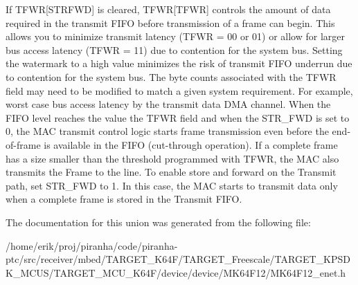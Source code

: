 If T\+F\+WR\mbox{[}S\+T\+R\+F\+WD\mbox{]} is cleared, T\+F\+WR\mbox{[}T\+F\+WR\mbox{]} controls the amount of data required in the transmit F\+I\+FO before transmission of a frame can begin. This allows you to minimize transmit latency (T\+F\+WR = 00 or 01) or allow for larger bus access latency (T\+F\+WR = 11) due to contention for the system bus. Setting the watermark to a high value minimizes the risk of transmit F\+I\+FO underrun due to contention for the system bus. The byte counts associated with the T\+F\+WR field may need to be modified to match a given system requirement. For example, worst case bus access latency by the transmit data D\+MA channel. When the F\+I\+FO level reaches the value the T\+F\+WR field and when the S\+T\+R\+\_\+\+F\+WD is set to \textquotesingle{}0\textquotesingle{}, the M\+AC transmit control logic starts frame transmission even before the end-\/of-\/frame is available in the F\+I\+FO (cut-\/through operation). If a complete frame has a size smaller than the threshold programmed with T\+F\+WR, the M\+AC also transmits the Frame to the line. To enable store and forward on the Transmit path, set S\+T\+R\+\_\+\+F\+WD to \textquotesingle{}1\textquotesingle{}. In this case, the M\+AC starts to transmit data only when a complete frame is stored in the Transmit F\+I\+FO. 

The documentation for this union was generated from the following file\+:\begin{DoxyCompactItemize}
\item 
/home/erik/proj/piranha/code/piranha-\/ptc/src/receiver/mbed/\+T\+A\+R\+G\+E\+T\+\_\+\+K64\+F/\+T\+A\+R\+G\+E\+T\+\_\+\+Freescale/\+T\+A\+R\+G\+E\+T\+\_\+\+K\+P\+S\+D\+K\+\_\+\+M\+C\+U\+S/\+T\+A\+R\+G\+E\+T\+\_\+\+M\+C\+U\+\_\+\+K64\+F/device/device/\+M\+K64\+F12/M\+K64\+F12\+\_\+enet.\+h\end{DoxyCompactItemize}
